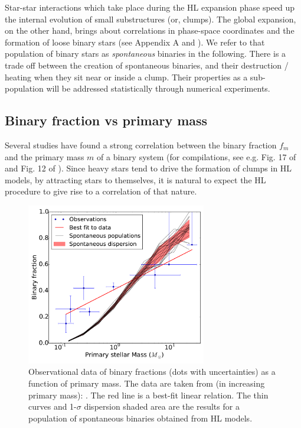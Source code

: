 Star-star interactions which take place during the HL expansion phase speed up the internal evolution of small substructures (or, clumps). The global expansion, on the other hand, brings about correlations in phase-space coordinates and the formation of loose binary stars (see Appendix A and \citealt{Kouwenhoven2010,Moeckel2011}). We refer to that population of binary stars as {\it spontaneous} binaries in the following. There is a trade off between the creation of spontaneous binaries, and their destruction / heating when they sit near or inside a clump. Their properties as a sub-population will be addressed statistically through numerical experiments.


\subsection{Binary fraction vs primary mass}
\label{Sub:spontaneous_binaryfractions}

Several studies have found a strong correlation between the binary fraction $f_m$ and the primary mass $m$ of a binary system (for compilations, see e.g. Fig. 17 of \citealt{Bate2012} and Fig. 12 of \citealt{Raghavan2010}). Since heavy stars tend to drive the formation of clumps in HL models, by attracting stars to themselves, it is natural to expect the HL procedure to give rise to a correlation of that nature.  



\begin{figure}
\begin{center}
\includegraphics[width=0.7\textwidth]{Figures/5_spontaneous_primarymass}
\caption{Observational data of binary fractions (dots with uncertainties) as a function of primary mass. The data are taken from (in increasing primary mass): \protect\cite{Close2003,Basri2006,Fischer1992,Ward-Duong2015,Raghavan2010,Patience2002,Preibisch1999,Mason1998}. The red line is a  best-fit linear relation. The thin curves and 1-$\sigma$ dispersion shaded area are the results for a population of  spontaneous binaries obtained from HL  models.}
\label{Fig:5_spontaneous_primarymass}
\end{center}
\end{figure}




